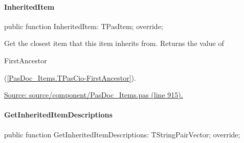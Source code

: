 \documentclass{report}
\newif\ifpdf
\begin{document}
\paragraph*{InheritedItem}\hspace*{\fill}

\label{PasDoc_Items.TPasCio-InheritedItem}
\begin{list}{}{
\setlength{\itemindent}{0cm}
\setlength{\listparindent}{0cm}
\setlength{\leftmargin}{\evensidemargin}
\addtolength{\leftmargin}{\tmplength}
\settowidth{\labelsep}{X}
\addtolength{\leftmargin}{\labelsep}
\setlength{\labelwidth}{\tmplength}
}
\item[\textbf{Declaration}\hfill]
\ifpdf
\begin{flushleft}
\fi
\begin{ttfamily}
public function InheritedItem: TPasItem; override;\end{ttfamily}

\ifpdf
\end{flushleft}
\fi

\par
\item[\textbf{Description}]
Get the closest item that this item inherits from. Returns the value of \begin{ttfamily}FirstAncestor\end{ttfamily}(\ref{PasDoc_Items.TPasCio-FirstAncestor}).\par
\href{https://github.com/pasdoc/pasdoc/blob/master/source/component/PasDoc_Items.pas#L915}{Source: source/component/PasDoc{\_}Items.pas (line 915).}

\end{list}
\paragraph*{GetInheritedItemDescriptions}\hspace*{\fill}

\label{PasDoc_Items.TPasCio-GetInheritedItemDescriptions}
\begin{list}{}{
\setlength{\itemindent}{0cm}
\setlength{\listparindent}{0cm}
\setlength{\leftmargin}{\evensidemargin}
\addtolength{\leftmargin}{\tmplength}
\settowidth{\labelsep}{X}
\addtolength{\leftmargin}{\labelsep}
\setlength{\labelwidth}{\tmplength}
}
\item[\textbf{Declaration}\hfill]
\ifpdf
\begin{flushleft}
\fi
\begin{ttfamily}
public function GetInheritedItemDescriptions: TStringPairVector; override;\end{ttfamily}

\ifpdf
\end{flushleft}
\fi

\end{list}
\end{document}
